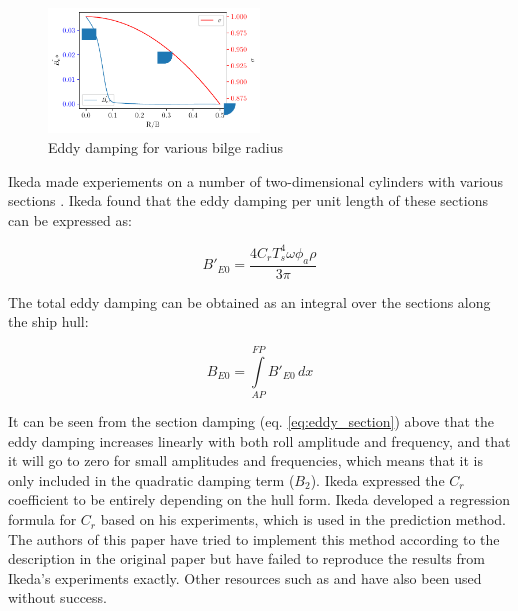    \begin{figure}[H]
        \begin{center}\includegraphics[width = 0.5\textwidth]{figures/eddy_sigma.pdf}\end{center}
        \vspace{-1cm}
        \caption{Eddy damping for various bilge radius}
        \label{fig:eddy_sigma}
    \end{figure}
    
    Ikeda made experiements on a number of two-dimensional cylinders with
various sections \cite{7505983/4AFVVGNT}. Ikeda found that the eddy
damping per unit length of these sections can be expressed as: 
 
            
    
    \begin{equation}
B'_{E0} = \frac{4 C_{r} T_{s}^{4} \omega \phi_{a} \rho}{3 \pi}
\label{eq:eddy_section}
\end{equation}

    

    The total eddy damping can be obtained as an integral over the sections
along the ship hull:
 
            
    
    \begin{equation}
B_{E0} = \int\limits_{AP}^{FP} B'_{E0}\, dx
\label{eq:equation}
\end{equation}

    

    It can be seen from the section damping (eq.
\ref{eq:eddy_section}) above that the eddy damping increases
linearly with both roll amplitude and frequency, and that it will go to
zero for small amplitudes and frequencies, which means that it is only
included in the quadratic damping term ($B_2$). Ikeda expressed the
$C_r$ coefficient to be entirely depending on the hull form. Ikeda
developed a regression formula for $C_r$ based on his experiments,
which is used in the prediction method. The authors of this paper have
tried to implement this method according to the description in the
original paper \cite{7505983/4AFVVGNT} but have failed to reproduce the
results from Ikeda's experiments exactly. Other resources such as
\cite{7505983/FB64RGPF} and \cite{7505983/KAKIM2E2} have also been used
without success.

